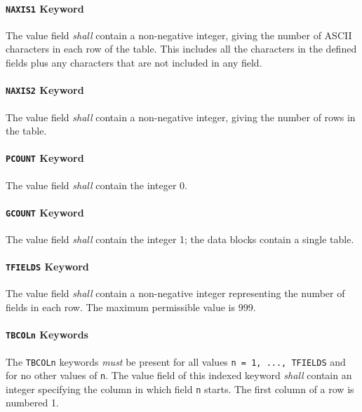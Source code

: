 \documentclass[11pt,makeidx]{book}     %
\begin{document}
   \paragraph{{\tt NAXIS1} Keyword}
 The value field {\em shall} contain a non-negative integer, 
 giving
 the number of ASCII characters in each row of the table.
 This includes all the characters in the defined fields plus
 any characters that are not included in any field.
   
   \paragraph{{\tt NAXIS2} Keyword}
 The value field {\em shall} contain a non-negative integer, 
 giving
 the number of rows in the table.
  
   \paragraph{{\tt PCOUNT} Keyword}
 The value field {\em shall} contain the integer 0. 
  
   \paragraph{{\tt GCOUNT} Keyword}
 The value field {\em shall} contain the integer 1; the data
 blocks contain a single table.
  
   \paragraph{{\tt TFIELDS} Keyword}
 The value field {\em shall} contain a non-negative integer 
 representing
 the number of fields in each row.  The maximum
 permissible value is 999.
  
   \paragraph{{\tt TBCOLn} Keywords}
 The {\tt TBCOLn} keywords {\em must} be present for all values 
 {\tt n = 1, ..., TFIELDS} and for no other values of {\tt n}.
 The value field of this indexed keyword {\em shall} contain an 
 integer
 specifying the column in which field {\tt n} starts.  
 The first column of a row is numbered 1.
\end{document}
